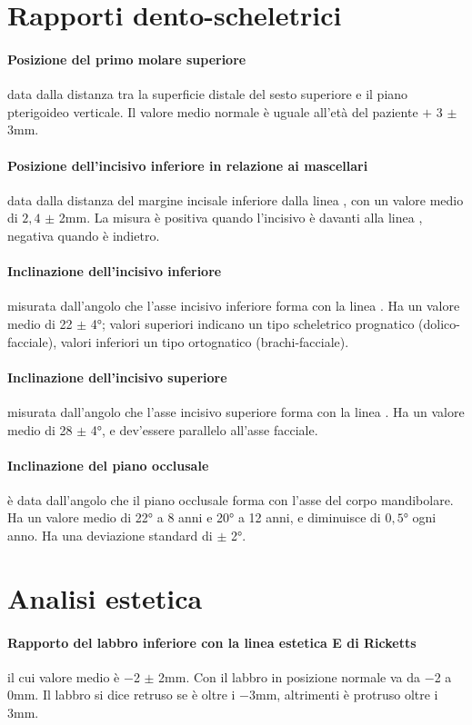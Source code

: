 \section{Rapporti dento-scheletrici}

\paragraph{Posizione del primo molare superiore} data dalla distanza tra la superficie distale del sesto superiore e il piano pterigoideo verticale. Il valore medio normale è uguale all'età del paziente $+$ 3 $\pm$ 3mm.

\paragraph{Posizione dell'incisivo inferiore in relazione ai mascellari} data dalla distanza del margine incisale inferiore dalla linea , con un valore medio di $2,4$ $\pm$ 2mm. La misura è positiva quando l'incisivo è davanti alla linea , negativa quando è indietro.

\paragraph{Inclinazione dell'incisivo inferiore} misurata dall'angolo che l'asse incisivo inferiore forma con la linea . Ha un valore medio di 22 $\pm$ 4°; valori superiori indicano un tipo scheletrico prognatico (dolico-facciale), valori inferiori un tipo ortognatico (brachi-facciale).

\paragraph{Inclinazione dell'incisivo superiore} misurata dall'angolo che l'asse incisivo superiore forma con la linea . Ha un valore medio di 28 $\pm$ 4°, e dev'essere parallelo all'asse facciale.

\paragraph{Inclinazione del piano occlusale} è data dall'angolo che il piano occlusale forma con l'asse del corpo mandibolare. Ha un valore medio di 22° a 8 anni e 20° a 12 anni, e diminuisce di $0,5$° ogni anno. Ha una deviazione standard di $\pm$ 2°.

\section{Analisi estetica}

\paragraph{Rapporto del labbro inferiore con la linea estetica E di Ricketts} il cui valore medio è $-$2 $\pm$ 2mm. Con il labbro in posizione normale va da $-$2 a 0mm. Il labbro si dice retruso se è oltre i $-$3mm, altrimenti è protruso oltre i 3mm.
